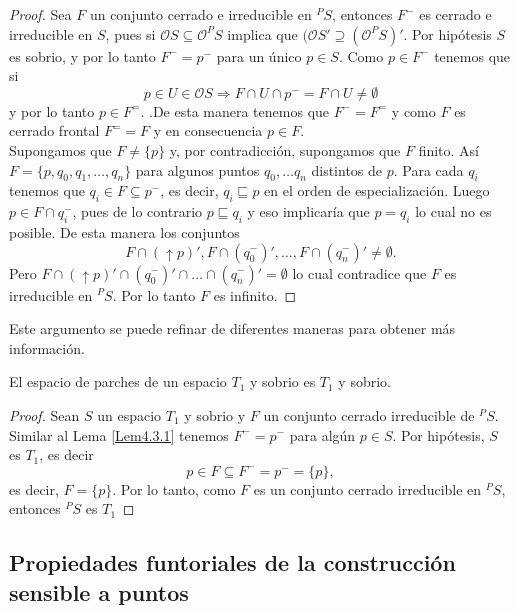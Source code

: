 \begin{proof}
    Sea $F$ un conjunto cerrado e irreducible en $^PS$, entonces $F^-$ es cerrado e irreducible en $S$, pues si $\mathcal{O}S\subseteq \mathcal{O}^PS$ implica que $(\mathcal{O}S'\supseteq (\mathcal{O}^PS)'$. Por hipótesis $S$ es sobrio, y por lo tanto $F^-=p^-$ para un único $p\in S$. Como $p\in F^-$ tenemos que si 
    \[
    p\in U\in \mathcal{O}S\Rightarrow F\cap U\cap p^-=F\cap U\neq \emptyset
    \]
    y por lo tanto $p\in F^=$. .De esta manera tenemos que $F^-=F^=$ y como $F$ es cerrado frontal $F^= =F$ y en consecuencia $p\in F$.\\

    Supongamos que $F\neq \{p\}$ y, por contradicción, supongamos que $F$ finito. Así $F=\{p, q_0, q_1, \dots , q_n\}$ para algunos puntos $q_0, \dots q_n$ distintos de $p$. Para cada $q_i$ tenemos que $q_i\in F\subseteq p^-$, es decir, $q_i\sqsubseteq p$ en el orden de especialización. Luego $p\in F\cap q_i^-$, pues de lo contrario $p\sqsubseteq q_i$ y eso implicaría que $p=q_i$ lo cual no es posible. De esta manera los conjuntos 
    \[
    F\cap (\uparrow p)', F\cap (q_0^-)', \dots , F\cap (q_n^-)'\neq \emptyset.
    \]
    Pero $F\cap (\uparrow p)'\cap (q_0^-)'\cap \dots \cap (q_n^-)'= \emptyset$ lo cual contradice que $F$ es irreducible en $^PS$. Por lo tanto $F$ es infinito.
\end{proof}

Este argumento se puede refinar de diferentes maneras para obtener más información.

\begin{lem}\label{Lem4.3.2}
    El espacio de parches de un espacio $T_1$ y sobrio es $T_1$ y sobrio.
\end{lem}

\begin{proof}
    Sean $S$ un espacio $T_1$ y sobrio y $F$ un conjunto cerrado irreducible de $^PS$. Similar al Lema \ref{Lem4.3.1} tenemos $F^-=p^-$ para algún $p\in S$. Por hipótesis, $S$ es $T_1$, es decir
    \[
    p\in F\subseteq F^-=p^-=\{p\},
    \]
    es decir, $F=\{p\}$. Por lo tanto, como $F$ es un conjunto cerrado irreducible en $^PS$, entonces $^PS$ es $T_1$
\end{proof}

\subsection{Propiedades funtoriales de la construcción sensible a puntos}\label{P. funtoriales spuntos}

